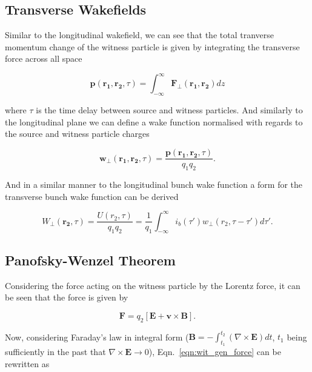 \subsection{Transverse Wakefields}

Similar to the longitudinal wakefield, we can see that the total tranverse momentum change of the witness particle is given by integrating the transverse force across all space

\begin{equation}
\mathbf{p}\left(\mathbf{r_{1}}, \mathbf{r_{2}}, \tau  \right) = \int^{\infty}_{-\infty} \mathbf{F_{\perp}} \left( \mathbf{r_{1}},  \mathbf{r_{2}}\right) dz
\end{equation}

where $\tau$ is the time delay between source and witness particles. And similarly to the longitudinal plane we can define a wake function normalised with regards to the source and witness particle charges

\begin{equation}
\mathbf{w_{\perp}}\left(\mathbf{r_{1}}, \mathbf{r_{2}}, \tau  \right) = \frac{\mathbf{p}\left(\mathbf{r_{1}}, \mathbf{r_{2}}, \tau  \right)}{q_{1} q_{2}}.
\label{eqn:trans_wake_func}
\end{equation}

And in a similar manner to the longitudinal bunch wake function a form for the transverse bunch wake function can be derived

\begin{equation}
W_{\perp}\left( \mathbf{r_{2}}, \tau \right) = \frac{U\left( r_{2}, \tau \right) }{q_{1} q_{2}} = \frac{1}{q_{1}}\int^{\infty}_{-\infty}i_{b}\left( \tau{}' \right) w_{\perp}\left( r_{2}, \tau{}-\tau{}'\right) d\tau{}' .
\end{equation}

\subsection{Panofsky-Wenzel Theorem}
\label{sec:PanWen}

Considering the force acting on the witness particle by the Lorentz force, it can be seen that the force is given by 

\begin{equation}
\mathbf{F} = q_{2} \left[\mathbf{E} + \mathbf{v}\times \mathbf{B} \right].
\label{eqn:wit_gen_force}
\end{equation}

Now, considering Faraday's law in integral form ($\mathbf{B} = -\int^{t_{2}}_{t_{1}} \left( \nabla \times \mathbf{E} \right) dt$, $t_{1}$ being sufficiently in the past that $\nabla \times \mathbf{E} \rightarrow 0$), Eqn.~\ref{eqn:wit_gen_force} can be rewritten as

